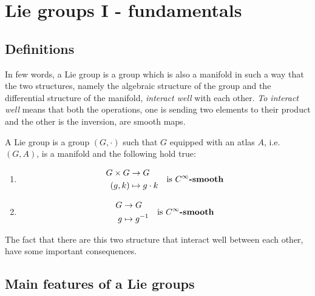 \documentclass[../main.tex]{subfiles}
\begin{document}
\setchapterpreamble[u]{\margintoc}
\chapter[Lie groups I - fundamentals]{Lie groups I - fundamentals\footnotemark[0]}
\section{Definitions}
In few words, a Lie group is a group which is also a manifold in such a way that the two structures, namely the algebraic structure of the group and the differential structure of the manifold, \textit{interact well} with each other. \textit{To interact well} means that both the operations, one is sending two elements to their product and the other is the inversion, are smooth maps.
\begin{definition}
A Lie group is a group $(G,\cdot)$ such that $G$ equipped with an atlas $A$, i.e. $(G,A)$, is a manifold and the following hold true:
\begin{enumerate}
    \item
    \[
    \begin{split}
        G\times G &\to G\\
        (g,k)&\mapsto g\cdot k
    \end{split} \quad \textrm{is $C^{\infty}$\textbf{-smooth}}
    \]
    \item 
    \[
    \begin{split}
        G &\to G\\
        g&\mapsto g^{-1}
    \end{split} \quad \textrm{is $C^{\infty}$\textbf{-smooth}}
    \]
\end{enumerate}
\end{definition}
The fact that there are this two structure that interact well between each other, have some important consequences.
\section{Main features of a Lie groups}
\end{document}
